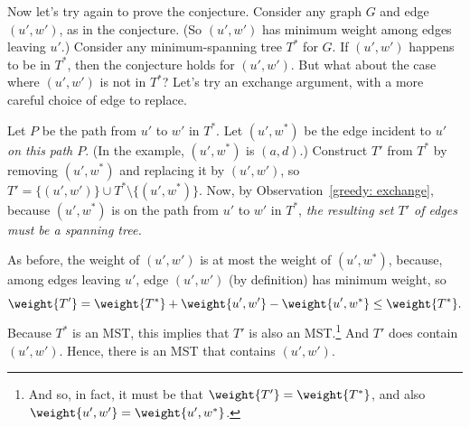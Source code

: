 
Now let's try again to prove the conjecture.
Consider any graph $G$ and edge $(u', w')$, as in the conjecture.
(So $(u',w')$ has minimum weight among edges leaving $u'$.)
Consider any minimum-spanning tree $T^*$ for $G$.
If $(u', w')$ happens to be in $T^*$, then the conjecture holds for $(u', w')$.
But what about the case where $(u', w')$ is not in $T^*$?
Let's try an exchange argument, with a more careful choice of edge to replace.

Let $P$ be the path from $u'$ to $w'$ in $T^*$.
Let $(u', w^*)$ be the edge incident to $u'$ \emph{on this path $P$}.
(In the example, $(u', w^*)$ is $(a, d)$.)
Construct $T'$ from $T^*$ by removing $(u', w^*)$ and replacing it by $(u', w')$,
so $T' = \{(u', w')\} \cup T^* \setminus \{(u', w^*)\}$.
Now, by Observation~\ref{greedy: exchange},
because $(u', w^*)$ is on the path from $u'$ to $w'$ in $T^*$,
\emph{the resulting set $T'$ of edges must be a spanning tree.}

As before, the weight of $(u', w')$ is at most the weight of $(u', w^*)$,
because, among edges leaving $u'$, edge $(u', w')$ (by definition) has minimum weight,
so
\[ \weight {T'} = \weight {T^*} + \weight {u', w'} - \weight {u', w^*} \le \weight{T^*}. \]
Because $T^*$ is an MST, this implies that $T'$ is also an MST.\footnote
{And so, in fact, it must be that $\weight{T'} = \weight{T^*}$, and also $\weight{u', w'} = \weight{u', w^*}$.}
And $T'$ does contain $(u', w')$.  Hence, there is an MST that contains $(u', w')$.

